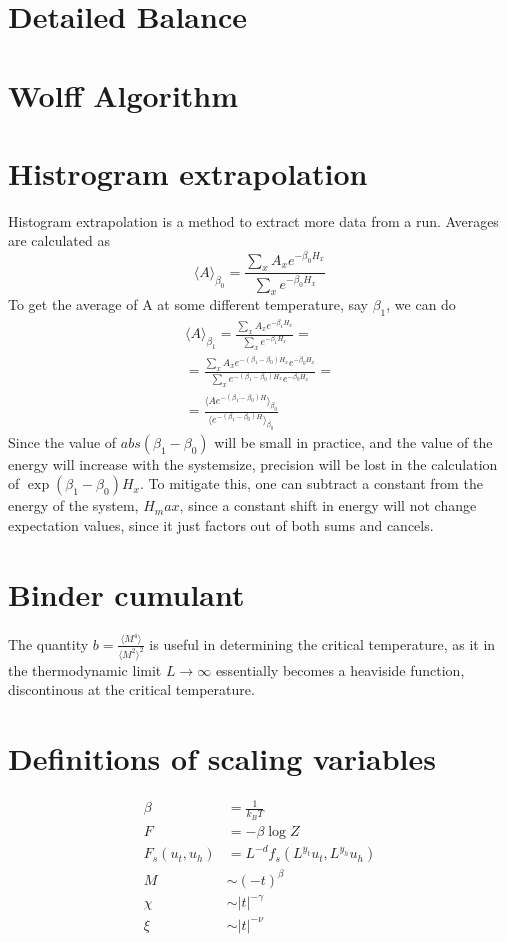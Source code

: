 \documentclass[a4paper]{article}
\begin{document}
\section{Detailed Balance}
\section{Wolff Algorithm}


\section{Histrogram extrapolation}
Histogram extrapolation is a method to extract more data from a run. 
Averages are calculated as
\begin{equation}
  \langle A \rangle_{\beta_0} =  \frac{\sum_{x}A_x e^{-\beta_0 H_x}}{\sum_{x}e^{-\beta_0 H_x}}
  \label{}
\end{equation}
To get the average of A at some different temperature, say $\beta_1$, we can do
\begin{align}
  \langle A\rangle_{\beta_1} =  \frac{\sum_{x}A_x e^{-\beta_1 H_x}}{\sum_{x}e^{-\beta_1 H_x}} = \\
  = \frac{\sum_x A_x e^{-(\beta_1 - \beta_0)H_x} e^{-\beta_0 H_x}}{\sum_x e^{-(\beta_1 - \beta_0)H_x}e^{-\beta_0 H_x}} = \\
  = \frac{\langle A e^{-(\beta_1 - \beta_0)H}\rangle_{\beta_0}}{\langle e^{-(\beta_1 - \beta_0)H}\rangle_{\beta_0}}
\end{align}
Since the value of $abs(\beta_1 -\beta_0)$ will be small in practice, and the value of the energy will increase with the systemsize, precision will be lost in the calculation of $\exp\left( \beta_1 - \beta_0 \right)H_x$. To mitigate this, one can subtract a constant from the energy of the system, $H_max$, since a constant shift in energy will not change expectation values, since it just factors out of both sums and cancels.
\section{Binder cumulant}
The quantity $b =\frac{\langle M^4 \rangle}{\langle M^2\rangle^2}$ is useful in determining the critical temperature, as it in the thermodynamic limit $L\rightarrow \infty $ essentially becomes a heaviside function, discontinous at the critical temperature. 
\section{Definitions of scaling variables}
\begin{align}
  \beta &= \frac{1}{k_B T} \\
  F &= -\beta \log Z\\
  F_s(u_t,u_h) &= L^{-d}f_s(L^{y_t}u_t,L^{y_h}u_h)\\
  M &\sim (-t)^{\beta}\\
  \chi &\sim |t|^{-\gamma}\\
  \xi &\sim |t|^{-\nu}
\end{align}  
\end{document}

